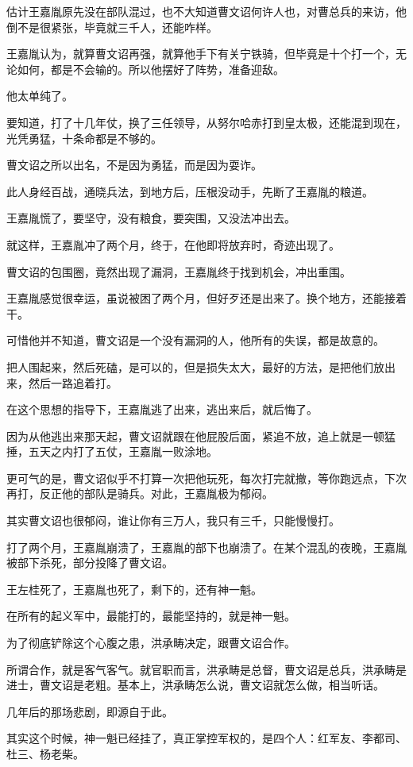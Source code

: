\begin{multicols}{\theparacolNo}
估计王嘉胤原先没在部队混过，也不大知道曹文诏何许人也，对曹总兵的来访，他倒不是很紧张，毕竟就三千人，还能咋样。

王嘉胤认为，就算曹文诏再强，就算他手下有关宁铁骑，但毕竟是十个打一个，无论如何，都是不会输的。所以他摆好了阵势，准备迎敌。

他太单纯了。

要知道，打了十几年仗，换了三任领导，从努尔哈赤打到皇太极，还能混到现在，光凭勇猛，十条命都是不够的。

曹文诏之所以出名，不是因为勇猛，而是因为耍诈。

此人身经百战，通晓兵法，到地方后，压根没动手，先断了王嘉胤的粮道。

王嘉胤慌了，要坚守，没有粮食，要突围，又没法冲出去。

就这样，王嘉胤冲了两个月，终于，在他即将放弃时，奇迹出现了。

曹文诏的包围圈，竟然出现了漏洞，王嘉胤终于找到机会，冲出重围。

王嘉胤感觉很幸运，虽说被困了两个月，但好歹还是出来了。换个地方，还能接着干。

可惜他并不知道，曹文诏是一个没有漏洞的人，他所有的失误，都是故意的。

把人围起来，然后死磕，是可以的，但是损失太大，最好的方法，是把他们放出来，然后一路追着打。

在这个思想的指导下，王嘉胤逃了出来，逃出来后，就后悔了。

因为从他逃出来那天起，曹文诏就跟在他屁股后面，紧追不放，追上就是一顿猛捶，五天之内打了五仗，王嘉胤一败涂地。

更可气的是，曹文诏似乎不打算一次把他玩死，每次打完就撤，等你跑远点，下次再打，反正他的部队是骑兵。对此，王嘉胤极为郁闷。

其实曹文诏也很郁闷，谁让你有三万人，我只有三千，只能慢慢打。

打了两个月，王嘉胤崩溃了，王嘉胤的部下也崩溃了。在某个混乱的夜晚，王嘉胤被部下杀死，部分投降了曹文诏。

王左桂死了，王嘉胤也死了，剩下的，还有神一魁。

在所有的起义军中，最能打的，最能坚持的，就是神一魁。

为了彻底铲除这个心腹之患，洪承畴决定，跟曹文诏合作。

所谓合作，就是客气客气。就官职而言，洪承畴是总督，曹文诏是总兵，洪承畴是进士，曹文诏是老粗。基本上，洪承畴怎么说，曹文诏就怎么做，相当听话。

几年后的那场悲剧，即源自于此。

其实这个时候，神一魁已经挂了，真正掌控军权的，是四个人：红军友、李都司、杜三、杨老柴。


\end{multicols}
